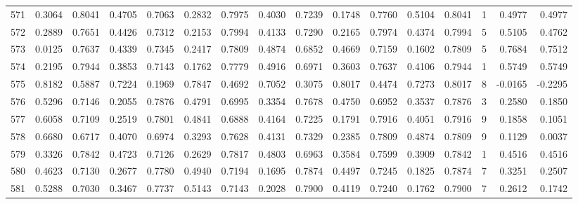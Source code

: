 \begin{tabular}{lrrrrrrrrrrrrrrr}
571 &      0.3064 &  0.8041 &  0.4705 &  0.7063 &  0.2832 &  0.7975 &  0.4030 &  0.7239 &  0.1748 &  0.7760 &   0.5104 &     0.8041 &      1 &                    0.4977 &                     0.4977 \\
572 &      0.2889 &  0.7651 &  0.4426 &  0.7312 &  0.2153 &  0.7994 &  0.4133 &  0.7290 &  0.2165 &  0.7974 &   0.4374 &     0.7994 &      5 &                    0.5105 &                     0.4762 \\
573 &      0.0125 &  0.7637 &  0.4339 &  0.7345 &  0.2417 &  0.7809 &  0.4874 &  0.6852 &  0.4669 &  0.7159 &   0.1602 &     0.7809 &      5 &                    0.7684 &                     0.7512 \\
574 &      0.2195 &  0.7944 &  0.3853 &  0.7143 &  0.1762 &  0.7779 &  0.4916 &  0.6971 &  0.3603 &  0.7637 &   0.4106 &     0.7944 &      1 &                    0.5749 &                     0.5749 \\
575 &      0.8182 &  0.5887 &  0.7224 &  0.1969 &  0.7847 &  0.4692 &  0.7052 &  0.3075 &  0.8017 &  0.4474 &   0.7273 &     0.8017 &      8 &                   -0.0165 &                    -0.2295 \\
576 &      0.5296 &  0.7146 &  0.2055 &  0.7876 &  0.4791 &  0.6995 &  0.3354 &  0.7678 &  0.4750 &  0.6952 &   0.3537 &     0.7876 &      3 &                    0.2580 &                     0.1850 \\
577 &      0.6058 &  0.7109 &  0.2519 &  0.7801 &  0.4841 &  0.6888 &  0.4164 &  0.7225 &  0.1791 &  0.7916 &   0.4051 &     0.7916 &      9 &                    0.1858 &                     0.1051 \\
578 &      0.6680 &  0.6717 &  0.4070 &  0.6974 &  0.3293 &  0.7628 &  0.4131 &  0.7329 &  0.2385 &  0.7809 &   0.4874 &     0.7809 &      9 &                    0.1129 &                     0.0037 \\
579 &      0.3326 &  0.7842 &  0.4723 &  0.7126 &  0.2629 &  0.7817 &  0.4803 &  0.6963 &  0.3584 &  0.7599 &   0.3909 &     0.7842 &      1 &                    0.4516 &                     0.4516 \\
580 &      0.4623 &  0.7130 &  0.2677 &  0.7780 &  0.4940 &  0.7194 &  0.1695 &  0.7874 &  0.4497 &  0.7245 &   0.1825 &     0.7874 &      7 &                    0.3251 &                     0.2507 \\
581 &      0.5288 &  0.7030 &  0.3467 &  0.7737 &  0.5143 &  0.7143 &  0.2028 &  0.7900 &  0.4119 &  0.7240 &   0.1762 &     0.7900 &      7 &                    0.2612 &                     0.1742 \\

\end{tabular}

